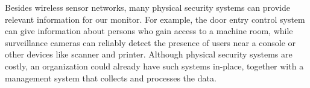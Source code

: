 Besides wireless sensor networks, many physical security systems
can provide relevant information for our monitor. For
example, the door entry control system
can give information about persons who gain access to
a machine room, while surveillance cameras can
reliably detect the presence of users near a console or other devices
like scanner and printer. Although physical security systems are costly,
an organization could already have such systems in-place,
together with a management system that collects and processes the data.

